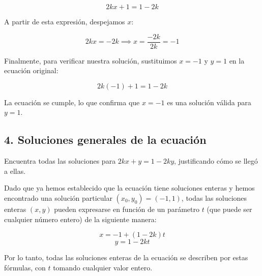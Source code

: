 \documentclass[12pt,a4paper]{article}
\begin{document}
\[
2kx + 1 = 1-2k
\]

A partir de esta expresión, despejamos \( x \):

\[
2kx = -2k \implies x = \frac{-2k}{2k} = -1
\]

Finalmente, para verificar nuestra solución, sustituimos \( x = -1 \) y \( y = 1 \) en la ecuación original:

\[
2k(-1) + 1 = 1-2k
\]

La ecuación se cumple, lo que confirma que \( x = -1 \) es una solución válida para \( y = 1 \).

\subsection*{4. Soluciones generales de la ecuación}
Encuentra todas las soluciones para \( 2kx + y = 1 - 2ky \), justificando cómo se llegó a ellas.

Dado que ya hemos establecido que la ecuación tiene soluciones enteras y hemos encontrado una solución particular \( (x_0, y_0) = (-1, 1) \), todas las soluciones enteras \( (x, y) \) pueden expresarse en función de un parámetro \( t \) (que puede ser cualquier número entero) de la siguiente manera:

\[
x = -1 + (1-2k)t
\]
\[
y = 1 - 2kt
\]

Por lo tanto, todas las soluciones enteras de la ecuación se describen por estas fórmulas, con \( t \) tomando cualquier valor entero.
\end{document}
